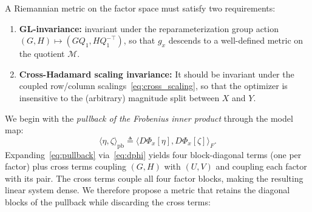 \documentclass[letterpaper, 10 pt, conference]{ieeeconf}
\newcommand{\cM}{\mathcal{M}}
\newcommand{\ip}[2]{\langle #1, #2 \rangle}
\theoremstyle{plain}
\theoremstyle{definition}
\theoremstyle{remark}
\begin{document}
A Riemannian metric on the factor space must satisfy two requirements:
\begin{enumerate}[nosep,label=(\roman*)]
  \item \textbf{GL-invariance:} invariant under the reparameterization group action $(G,H)\mapsto(GQ_1,HQ_1^{-\top})$, so that $g_x$ descends to a well-defined metric on the quotient $\cM$.
  \item \textbf{Cross-Hadamard scaling invariance:} It should be invariant under the coupled row/column scalings~\eqref{eq:cross_scaling}, so that the optimizer is insensitive to the (arbitrary) magnitude split between $X$ and $Y$.
\end{enumerate}
We begin with the \emph{pullback of the Frobenius inner product} through the model map:
\begin{equation}
  \ip{\eta}{\zeta}_{\mathrm{pb}} \triangleq \ip{D\Phi_x[\eta]}{D\Phi_x[\zeta]}_F.
  \label{eq:pullback}
\end{equation}
Expanding~\eqref{eq:pullback} via~\eqref{eq:dphi} yields four block-diagonal terms (one per factor) plus cross terms coupling $(G,H)$ with $(U,V)$ and coupling each factor with its pair.
The cross terms couple all four factor blocks, making the resulting linear system dense.
We therefore propose a metric that retains the diagonal blocks of the pullback while discarding the cross terms:
\end{document}
